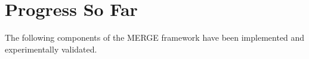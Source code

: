 \documentclass[11pt]{article}
\begin{document}





\section{Progress So Far}

The following components of the MERGE framework have been implemented and experimentally
validated.
\end{document}
